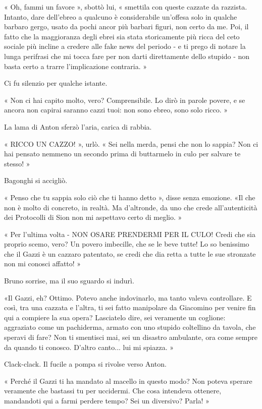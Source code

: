 « Oh, fammi un favore », sbottò lui, « smettila con queste cazzate da razzista. Intanto, dare dell'ebreo a qualcuno è considerabile un'offesa solo in qualche barbaro gergo, usato da pochi ancor più barbari figuri, non certo da me. Poi, il fatto che la maggioranza degli ebrei sia stata storicamente più ricca del ceto sociale più incline a credere alle fake news del periodo - e ti prego di notare la lunga perifrasi che mi tocca fare per non darti direttamente dello stupido - non basta certo a trarre l'implicazione contraria. »

Ci fu silenzio per qualche istante.

« Non ci hai capito molto, vero? Comprensibile. Lo dirò in parole povere, e se ancora non capirai saranno cazzi tuoi: non sono ebreo, sono solo ricco. »

La lama di Anton sferzò l'aria, carica di rabbia.

« RICCO UN CAZZO! », urlò. « Sei nella merda, pensi che non lo sappia? Non ci hai pensato nemmeno un secondo prima di buttarmelo in culo per salvare te stesso! »

Bagonghi si accigliò.

« Penso che tu sappia solo ciò che ti hanno detto », disse senza emozione. «Il che non è molto di concreto, in realtà. Ma d'altronde, da uno che crede all'autenticità dei Protocolli di Sion non mi aspettavo certo di meglio. »

« Per l'ultima volta - NON OSARE PRENDERMI PER IL CULO! Credi che sia proprio scemo, vero? Un povero imbecille, che se le beve tutte! Lo so benissimo che il Gazzi è un cazzaro patentato, se credi che dia retta a tutte le sue stronzate non mi conosci affatto! »

Bruno sorrise, ma il suo sguardo si indurì.

«Il Gazzi, eh? Ottimo. Potevo anche indovinarlo, ma tanto valeva controllare. E così, tra una cazzata e l'altra, ti sei fatto manipolare da Giacomino per venire fin qui a compiere la sua opera? Lasciatelo dire, sei veramente un coglione: aggraziato come un pachiderma, armato con uno stupido coltellino da tavola, che speravi di fare? Non ti smentisci mai, sei un disastro ambulante, ora come sempre da quando ti conosco. D'altro canto... lui mi spiazza. »

Clack-clack. Il fucile a pompa si rivolse verso Anton.

« Perché il Gazzi ti ha mandato al macello in questo modo? Non poteva sperare veramente che bastassi tu per uccidermi. Che cosa intendeva ottenere, mandandoti qui a farmi perdere tempo? Sei un diversivo? Parla! »   

